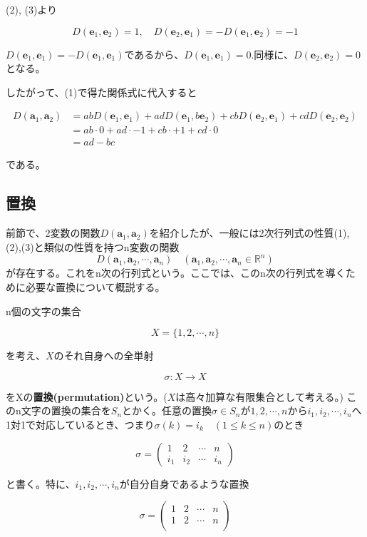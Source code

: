 \documentclass[dvipdfmx,autodetect-engine]{jsarticle}
\newcommand{\vecSpace}[1]{\mathbb{R}^{#1}}
\begin{document}
(2), (3)より

$$
D(\bm{e}_1, \bm{e}_2) = 1, \quad D(\bm{e}_2, \bm{e}_1) = -D(\bm{e}_1, \bm{e}_2) = -1
$$

$D(\bm{e}_1, \bm{e}_1) = -D(\bm{e}_1, \bm{e}_1)$であるから、$D(\bm{e}_1, \bm{e}_1) = 0$.同様に、$D(\bm{e}_2, \bm{e}_2) = 0$となる。

したがって、(1)で得た関係式に代入すると

\begin{equation*}
\begin{split}
D(\bm{a}_1, \bm{a}_2) &= abD(\bm{e}_1, \bm{e}_1) + adD(\bm{e}_1, b\bm{e}_2) + cbD(\bm{e}_2, \bm{e}_1) + cdD(\bm{e}_2, \bm{e}_2) \\
&= ab \cdot 0 + ad \cdot -1 + cb \cdot + 1 + cd \cdot 0 \\
&= ad - bc
\end{split}
\end{equation*}

である。

\subsection{置換}

前節で、2変数の関数$D(\bm{a}_1, \bm{a}_2)$を紹介したが、一般には2次行列式の性質(1),(2),(3)と類似の性質を持つn変数の関数
$$
D(\bm{a}_1, \bm{a}_2, \cdots, \bm{a}_n) \quad (\bm{a}_1, \bm{a}_2, \cdots, \bm{a}_n \in \vecSpace{n})
$$
が存在する。これをn次の行列式という。ここでは、このn次の行列式を導くために必要な置換について概説する。

n個の文字の集合

$$
X = \{1, 2, \cdots, n\}
$$

を考え、$X$のそれ自身への全単射

$$
\sigma: X \to X
$$

をXの{\bf 置換(permutation)}という。($X$は高々加算な有限集合として考える。)
このn文字の置換の集合を$S_n$とかく。任意の置換$\sigma \in S_n$が$1, 2, \cdots, n$から$i_1, i_2, \cdots, i_n$へ1対1で対応しているとき、つまり$\sigma(k) = i_k \quad (1 \leq k \leq n)$のとき

$$
\sigma = \begin{pmatrix}
1 & 2 & \cdots & n \\
i_1 & i_2 & \cdots &i_n
\end{pmatrix}
$$

と書く。特に、$i_1, i_2, \cdots, i_n$が自分自身であるような置換

$$
\sigma = \begin{pmatrix}
1 & 2 & \cdots & n \\
1 & 2 & \cdots & n \\
\end{pmatrix}
$$
\end{document}
